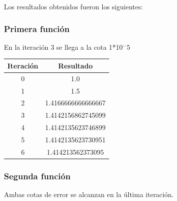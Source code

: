 \documentclass[titlepage,a4paper]{article}
\begin{document}
Los resultados obtenidos fueron los siguientes:

\subsubsection{Primera función}\label{sec:NR1}
En la iteración 3 se llega a la cota 1*10$^-5$
\begin{center}
    \begin{tabular}{| c | c |}
    \hline
     Iteración & Resultado \\ \hline
     0     &  1.0 \\
1     &  1.5 \\
2     &  1.4166666666666667 \\
3     &  1.4142156862745099 \\
4     &  1.4142135623746899 \\
5     &  1.4142135623730951 \\
6     &  1.414213562373095 \\
    \hline
    \end{tabular}
\end{center}
\subsubsection{Segunda función}\label{sec:NR2}
Ambas cotas de error se alcanzan en la última iteración.
\end{document}
